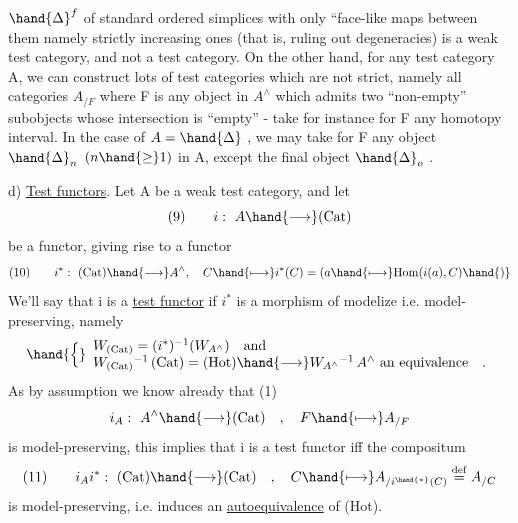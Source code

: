 $\hand{\Delta}^{f}$ of standard ordered simplices with only ``face-like maps between them\hand{,}
namely strictly increasing ones (that is, ruling out degeneracies) is
a weak test category, and not a test category. On the other hand, for
any test category A, we can construct lots of test categories which are
not strict, namely all categories $A_{/F}$ where F is any  object in $A^{\wedge}$ which
admits two ``non-empty'' subobjects whose intersection is ``empty'' - take
for instance for F any homotopy interval. In the case of $A = \hand{\Delta}$ , we may
take for F any object $\hand{\Delta}_{n}$ $(n \hand{\geq} 1)$ in A, except  the final object $\hand{\Delta}_{o}$ .



d) \uline{Test functors}. Let A be a weak test category, and let
\[ (9) \qquad i:\ A \hand{\longrightarrow} (\mathrm{Cat}) \]
be a functor, giving rise to a functor
\[ (10) \qquad i^{*} :\ (\mathrm{Cat}) \hand{\longrightarrow} A^{\wedge} , \quad C \hand{\longmapsto} i^{*}(C) = (a \hand{\longmapsto} \mathrm{Hom}(i(a),C)\hand{)} \]
We'll say that i is a  \uline{test functor} if $i^{*}$ is  a morphism of modelize
i.e. model-preserving, namely
\[ \hand{\Big\{}\begin{array}{l} W_{(\mathrm{Cat})} = (i^{*})^{-1}(W_{A^{\wedge}}) \quad \text{and} \\ W_{(\mathrm{Cat})}{}^{-1}\,(\mathrm{Cat}) = (\mathrm{Hot}) \hand{\longrightarrow} W_{A^{\wedge}}{}^{-1}\,A^{\wedge} \text{ an equivalence} \quad . \end{array} \]
As by assumption we know already that (1)
\[ i_{A} :\ A^{\wedge} \hand{\longrightarrow} (\mathrm{Cat}) \quad , \quad F \hand{\longmapsto} A_{/F} \]
is model-preserving, this implies that i is a  test functor iff the
compositum
\[ (11) \qquad i_{A}i^{*} :\ (\mathrm{Cat}) \hand{\longrightarrow} (\mathrm{Cat}) \quad , \quad C \hand{\longmapsto} A_{/i^{\hand{*}}(C)} \overset{\mathrm{def}}{=} A_{/C} \]
is model-preserving, i.e.  induces an \uline{autoequivalence} of (Hot).

